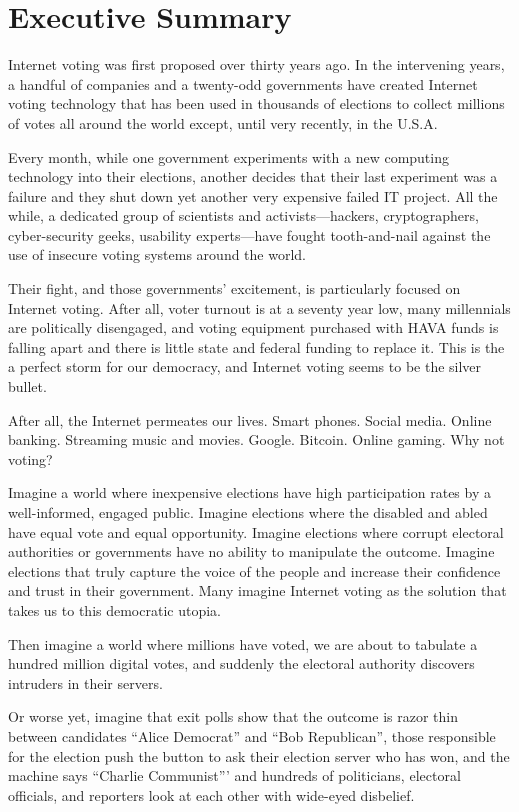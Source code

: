 \chapter{Executive Summary}
\label{chapter:executive_summary}

Internet voting was first proposed over thirty years ago. In the
intervening years, a handful of companies and a twenty-odd governments
have created Internet voting technology that has been used in
thousands of elections to collect millions of votes all around the
world except, until very recently, in the U.S.A.

Every month, while one government experiments with a new computing
technology into their elections, another decides that their last
experiment was a failure and they shut down yet another very expensive
failed IT project. All the while, a dedicated group of scientists and
activists---hackers, cryptographers, cyber-security geeks, usability
experts---have fought tooth-and-nail against the use of insecure
voting systems around the world.

Their fight, and those governments' excitement, is particularly
focused on Internet voting. After all, voter turnout is at a seventy
year low, many millennials are politically disengaged, and voting
equipment purchased with HAVA funds is falling apart and there is
little state and federal funding to replace it. This is the a perfect
storm for our democracy, and Internet voting seems to be the silver
bullet.

After all, the Internet permeates our lives. Smart phones. Social
media. Online banking. Streaming music and
movies. Google. Bitcoin. Online gaming. Why not voting?

Imagine a world where inexpensive elections have high participation
rates by a well-informed, engaged public. Imagine elections where the
disabled and abled have equal vote and equal opportunity. Imagine
elections where corrupt electoral authorities or governments have no
ability to manipulate the outcome. Imagine elections that truly
capture the voice of the people and increase their confidence and
trust in their government. Many imagine Internet voting as the
solution that takes us to this democratic utopia.

Then imagine a world where millions have voted, we are about to
tabulate a hundred million digital votes, and suddenly the electoral
authority discovers intruders in their servers.

Or worse yet, imagine that exit polls show that the outcome is razor
thin between candidates “Alice Democrat” and “Bob Republican”, those
responsible for the election push the button to ask their election
server who has won, and the machine says “Charlie Communist”' and
hundreds of politicians, electoral officials, and reporters look at
each other with wide-eyed disbelief.

